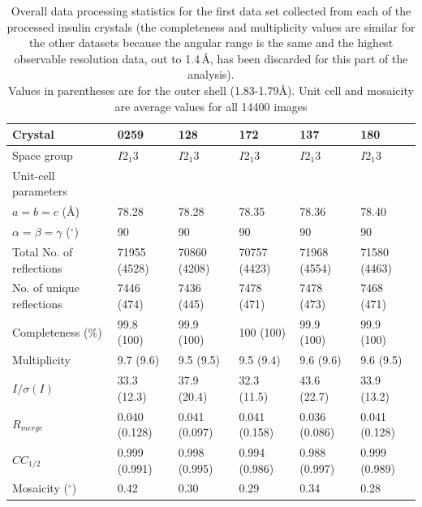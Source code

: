 \begin{table}[ht!]
\centering
\captionsetup{justification=centering}
	\caption[Data processing statistics for the first data set collected from each of the processed insulin crystals.]{Overall data processing statistics for the first data set collected from each of the processed insulin crystals (the completeness and multiplicity values are similar for the other datasets because the angular range is the same and the highest observable resolution data, out to 1.4\,\AA, has been discarded for this part of the analysis).
	\\[1pt]
	Values in parentheses are for the outer shell (1.83-1.79\AA). Unit cell and mosaicity are average values for all 14400 images}
	\centering
	\begin{tabular}{p{3.5cm} p{2cm} p{2cm} p{2cm} p{2cm} p{2cm}}
		\hline
		Crystal  																	&0259				   &128						&172					 &137						&180						\\
		\hline
		Space group   														&$I$2$_{\text{1}}$3	 &$I$2$_{\text{1}}$3		&$I$2$_{\text{1}}$3	   &$I$2$_{\text{1}}$3			&$I$2$_{\text{1}}$3 		\\
		Unit-cell parameters  										& 						 &    					&   					 &   						&  						 	\\
		$a = b = c$ (\AA)  																&78.28				 &78.28					&78.35				 &78.36 				&78.40					\\
		$\alpha = \beta = \gamma$ ($^{\circ}$) 		&90					   &90 						&90						 &90					 	&90							\\
		Total No. of reflections									&71955 (4528)  &70860 (4208)	&70757 (4423)	 &71968 (4554)	&71580 (4463)		\\
		No. of unique reflections									&7446 (474)	   &7436 (445)		&7478 (471)		 &7478 (473)		&7468 (471)			\\
		Completeness (\%) 											&99.8 (100)	   &99.9 (100)		&100 (100)		 &99.9 (100)		&99.9 (100) 		\\
		Multiplicity															&9.7 (9.6)		 &9.5 (9.5)			&9.5 (9.4)		 &9.6 (9.6)		  &9.6 (9.5)			\\
		$I/\sigma (I)$												 		&33.3 (12.3)	 &37.9 (20.4)		&32.3	 (11.5)	 &43.6 (22.7)	  &33.9 (13.2)  	\\
		$R_{merge}$													&0.040 (0.128) &0.041 (0.097) &0.041 (0.158) &0.036 (0.086) &0.041 (0.128)  \\
		$CC_{1/2}$																&0.999 (0.991) &0.998 (0.995) &0.994 (0.986) &0.988 (0.997) &0.999 (0.989)	\\
		Mosaicity ($^{\circ}$)										&0.42				   &0.30					&0.29					 &0.34					&0.28						\\
		\hline
	\end{tabular}
	\label{tab: Hamburg data processing}
\end{table}

